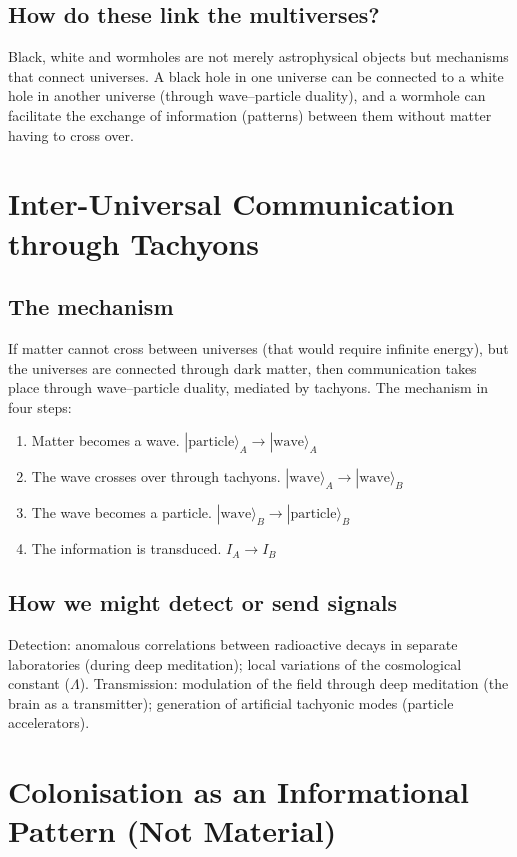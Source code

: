 \documentclass[11pt,a4paper]{article}
\begin{document}
\subsection{How do these link the multiverses?}
Black, white and wormholes are not merely astrophysical objects but mechanisms that connect universes. A black hole in one universe can be connected to a white hole in another universe (through wave--particle duality), and a wormhole can facilitate the exchange of information (patterns) between them without matter having to cross over.

\section{Inter-Universal Communication through Tachyons}
\subsection{The mechanism}
If matter cannot cross between universes (that would require infinite energy), but the universes are connected through dark matter, then communication takes place through wave--particle duality, mediated by tachyons. The mechanism in four steps:
\begin{enumerate}
    \item Matter becomes a wave. $|\text{particle}\rangle_A \to |\text{wave}\rangle_A$
    \item The wave crosses over through tachyons. $|\text{wave}\rangle_A \to |\text{wave}\rangle_B$
    \item The wave becomes a particle. $|\text{wave}\rangle_B \to |\text{particle}\rangle_B$
    \item The information is transduced. $I_A \to I_B$
\end{enumerate}

\subsection{How we might detect or send signals}
Detection: anomalous correlations between radioactive decays in separate laboratories (during deep meditation); local variations of the cosmological constant ($\Lambda$). Transmission: modulation of the field through deep meditation (the brain as a transmitter); generation of artificial tachyonic modes (particle accelerators).

\section{Colonisation as an Informational Pattern (Not Material)}
\end{document}
